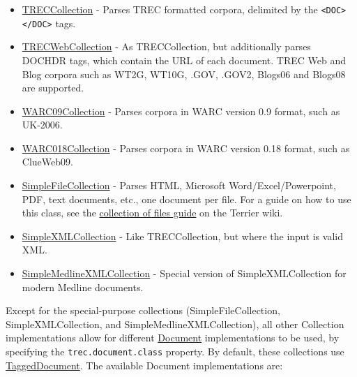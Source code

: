 \begin{itemize}
\tightlist
\item
  \href{javadoc/org/terrier/indexing/TRECCollection.html}{TRECCollection}
  - Parses TREC formatted corpora, delimited by the
  \texttt{\textless{}DOC\textgreater{}\textless{}/DOC\textgreater{}}
  tags.
\item
  \href{javadoc/org/terrier/indexing/TRECWebCollection.html}{TRECWebCollection}
  - As TRECCollection, but additionally parses DOCHDR tags, which
  contain the URL of each document. TREC Web and Blog corpora such as
  WT2G, WT10G, .GOV, .GOV2, Blogs06 and Blogs08 are supported.
\item
  \href{javadoc/org/terrier/indexing/WARC09Collection.html}{WARC09Collection}
  - Parses corpora in WARC version 0.9 format, such as UK-2006.
\item
  \href{javadoc/org/terrier/indexing/WARC018Collection.html}{WARC018Collection}
  - Parses corpora in WARC version 0.18 format, such as ClueWeb09.
\item
  \href{javadoc/org/terrier/indexing/SimpleFileCollection.html}{SimpleFileCollection}
  - Parses HTML, Microsoft Word/Excel/Powerpoint, PDF, text documents,
  etc., one document per file. For a guide on how to use this class, see
  the
  \href{http://ir.dcs.gla.ac.uk/wiki/Terrier/CollectionOfFiles}{collection
  of files guide} on the Terrier wiki.
\item
  \href{javadoc/org/terrier/indexing/SimpleXMLCollection.html}{SimpleXMLCollection}
  - Like TRECCollection, but where the input is valid XML.
\item
  \href{javadoc/org/terrier/indexing/SimpleMedlineXMLCollection.html}{SimpleMedlineXMLCollection}
  - Special version of SimpleXMLCollection for modern Medline documents.
\end{itemize}

Except for the special-purpose collections (SimpleFileCollection,
SimpleXMLCollection, and SimpleMedlineXMLCollection), all other
Collection implementations allow for different
\href{javadoc/org/terrier/indexing/Document.html}{Document}
implementations to be used, by specifying the
\texttt{trec.document.class} property. By default, these collections use
\href{javadoc/org/terrier/indexing/TaggedDocument.html}{TaggedDocument}.
The available Document implementations are:

